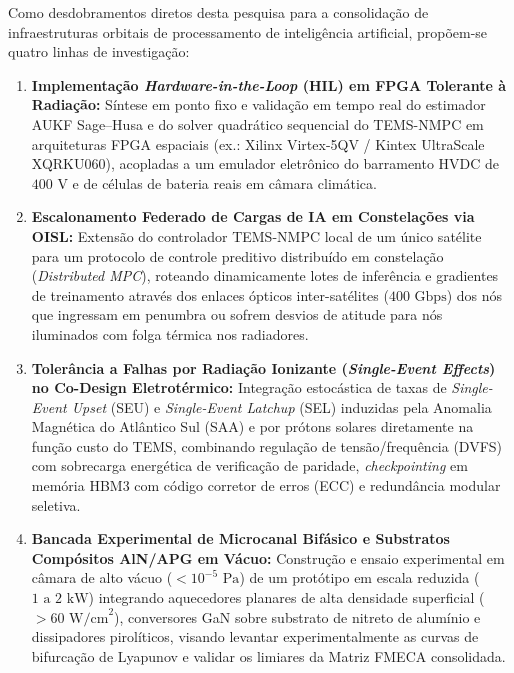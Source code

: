 Como desdobramentos diretos desta pesquisa para a consolidação de infraestruturas orbitais de processamento de inteligência artificial, propõem-se quatro linhas de investigação:
\begin{enumerate}[label=\textbf{(\alph*)},leftmargin=*]
    \item \textbf{Implementação \textit{Hardware-in-the-Loop} (HIL) em FPGA Tolerante à Radiação:} Síntese em ponto fixo e validação em tempo real do estimador AUKF Sage--Husa e do solver quadrático sequencial do TEMS-NMPC em arquiteturas FPGA espaciais (ex.: Xilinx Virtex-5QV / Kintex UltraScale XQRKU060), acopladas a um emulador eletrônico do barramento HVDC de $400\text{ V}$ e de células de bateria reais em câmara climática.
    \item \textbf{Escalonamento Federado de Cargas de IA em Constelações via OISL:} Extensão do controlador TEMS-NMPC local de um único satélite para um protocolo de controle preditivo distribuído em constelação (\textit{Distributed MPC}), roteando dinamicamente lotes de inferência e gradientes de treinamento através dos enlaces ópticos inter-satélites ($400\text{ Gbps}$) dos nós que ingressam em penumbra ou sofrem desvios de atitude para nós iluminados com folga térmica nos radiadores.
    \item \textbf{Tolerância a Falhas por Radiação Ionizante (\textit{Single-Event Effects}) no Co-Design Eletrotérmico:} Integração estocástica de taxas de \textit{Single-Event Upset} (SEU) e \textit{Single-Event Latchup} (SEL) induzidas pela Anomalia Magnética do Atlântico Sul (SAA) e por prótons solares diretamente na função custo do TEMS, combinando regulação de tensão/frequência (DVFS) com sobrecarga energética de verificação de paridade, \textit{checkpointing} em memória HBM3 com código corretor de erros (ECC) e redundância modular seletiva.
    \item \textbf{Bancada Experimental de Microcanal Bifásico e Substratos Compósitos AlN/APG em Vácuo:} Construção e ensaio experimental em câmara de alto vácuo ($< 10^{-5}\text{ Pa}$) de um protótipo em escala reduzida ($1\text{ a }2\text{ kW}$) integrando aquecedores planares de alta densidade superficial ($> 60\text{ W/cm}^2$), conversores GaN sobre substrato de nitreto de alumínio e dissipadores pirolíticos, visando levantar experimentalmente as curvas de bifurcação de Lyapunov e validar os limiares da Matriz FMECA consolidada.
\end{enumerate}
